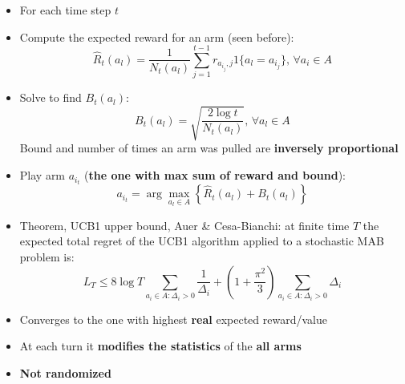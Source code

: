     \begin{itemize}
        \item For each time step $t$
        \item Compute the expected reward for an arm (seen before):
        $$\hat{R}_t(a_l)=\frac{1}{N_t(a_l)}\sum_{j=1}^{t-1}r_{a_{i_j},j}1\{a_l=a_{i_j}\},\,\forall a_i\in A$$
        \item Solve to find $B_t(a_l)$:
        $$B_t(a_l)=\sqrt{\frac{2\log t}{N_t(a_l)}},\,\forall a_l\in A$$
        Bound and number of times an arm was pulled are \textbf{inversely proportional}
        \item Play arm $a_{i_t}$ (\textbf{the one with max sum of reward and bound}):
        $$a_{i_t}=\arg\max_{a_l\in A}\left\{\hat{R}_t(a_l)+B_t(a_l)\right\}$$
        \item Theorem, UCB1 upper bound, Auer \& Cesa-Bianchi: at finite time $T$ the expected total regret of the UCB1 algorithm applied to a stochastic MAB problem is:
        $$L_T\leq 8\log T\sum_{a_i\in A:\Delta_i>0}\frac{1}{\Delta_i}+\left(1+\frac{\pi^2}{3}\right)\sum_{a_i\in A:\Delta_i>0}\Delta_i$$
        \item Converges to the one with highest \textbf{real} expected reward/value
        \item At each turn it \textbf{modifies the statistics} of the \textbf{all arms}
        \item \textbf{Not randomized}
    \end{itemize}
